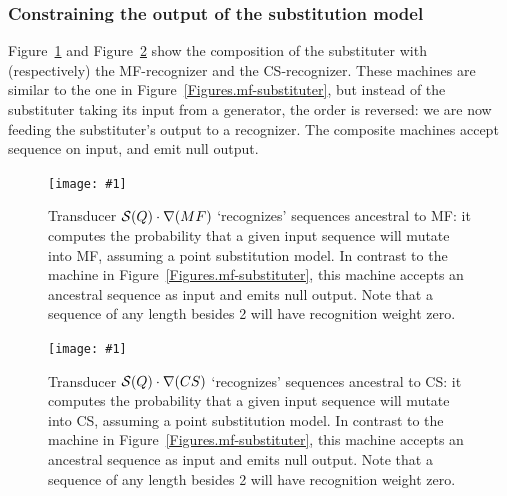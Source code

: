 \documentclass{article}
\newcommand{\figref}[1]{Figure~\ref{Figures.#1}}
\newcommand{\figlabel}[1]{\label{Figures.#1}}
\newcommand{\easyfig}[4]{
\begin{figure}
\texttt{[image: \#1]}
\caption{ \figlabel{#3} #4}
\end{figure}}
\newcommand{\widepdffig}[2]{\easyfig{#1-fig.pdf}{width=\textwidth}{#1}{#2}}
\newcommand{\tallpdffig}[2]{\easyfig{#1-fig.pdf}{height=.8\textheight}{#1}{#2}}
\newcommand\substitute{{\cal S}}
\newcommand\tkf{{\cal B}}
\newcommand\recognize{\nabla}
\begin{document}
\subsubsection{Constraining the output of the substitution model}
\figref{substituter-mf}  and \figref{substituter-cs}  show the composition of the substituter with (respectively) the MF-recognizer and the CS-recognizer.  
These machines are similar to the one in
\figref{mf-substituter},
but instead of the substituter taking its input from a generator,
the order is reversed: we are now feeding the substituter's output to a recognizer.
The composite machines accept sequence on input, and emit null output.


\widepdffig{substituter-mf}{Transducer $\substitute(Q) \cdot \recognize(MF)$ `recognizes' sequences ancestral to MF:
it computes the probability that a given input sequence will mutate into MF, assuming a point substitution model.
In contrast to the machine in \figref{mf-substituter}, this machine accepts an ancestral sequence as input and emits null output.  Note that a sequence of any length besides 2 will have recognition weight zero. }

\widepdffig{substituter-cs}{Transducer $\substitute(Q) \cdot \recognize(CS)$ `recognizes' sequences ancestral to CS:
it computes the probability that a given input sequence will mutate into CS, assuming a point substitution model.
In contrast to the machine in \figref{mf-substituter}, this machine accepts an ancestral sequence as input and emits null output.  Note that a sequence of any length besides 2 will have recognition weight zero. }




\end{document}
